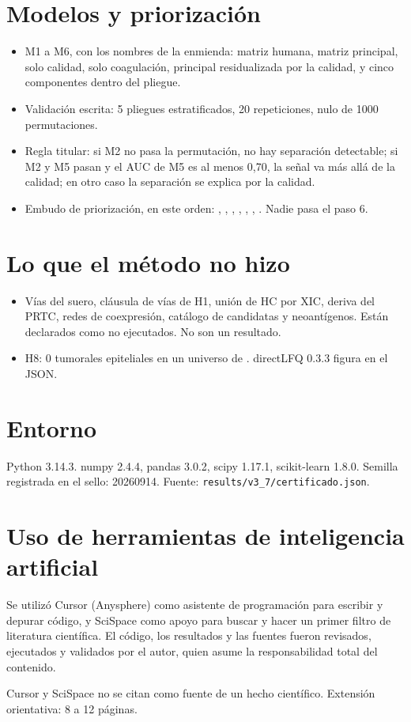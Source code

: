 \section{Modelos y priorización}
\begin{itemize}
\item M1 a M6, con los nombres de la enmienda: matriz humana, matriz principal, solo calidad, solo coagulación, principal residualizada por la calidad, y cinco componentes dentro del pliegue.
\item Validación escrita: 5 pliegues estratificados, 20 repeticiones, nulo de 1000 permutaciones.
\item Regla titular: si M2 no pasa la permutación, no hay separación detectable; si M2 y M5 pasan y el AUC de M5 es al menos 0,70, la señal va más allá de la calidad; en otro caso la separación se explica por la calidad.
\item Embudo de priorización, en este orden: \PrioriPasoUno, \PrioriPasoDos, \PrioriPasoTres, \PrioriPasoCuatro, \PrioriPasoCinco, \PrioriPasoSeis, \PrioriPasoSiete. Nadie pasa el paso 6.
\end{itemize}

\section{Lo que el método no hizo}
\begin{itemize}
\item Vías del suero, cláusula de vías de H1, unión de HC por XIC, deriva del PRTC, redes de coexpresión, catálogo de candidatas y neoantígenos. Están declarados como no ejecutados. No son un resultado.
\item H8: 0 tumorales epiteliales en un universo de \HochoUniverso. directLFQ 0.3.3 figura en el JSON. \cite{ammar2023}
\end{itemize}

\section{Entorno}
Python 3.14.3. numpy 2.4.4, pandas 3.0.2, scipy 1.17.1, scikit-learn 1.8.0. Semilla registrada en el sello: 20260914. Fuente: \texttt{results/v3\_7/certificado.json}.

\section{Uso de herramientas de inteligencia artificial}
Se utilizó Cursor (Anysphere) como asistente de programación para escribir y depurar código, y SciSpace como apoyo para buscar y hacer un primer filtro de literatura científica. El código, los resultados y las fuentes fueron revisados, ejecutados y validados por el autor, quien asume la responsabilidad total del contenido. \cite{cursor2026,scispace2026}

Cursor y SciSpace no se citan como fuente de un hecho científico.
Extensión orientativa: 8 a 12 páginas.
